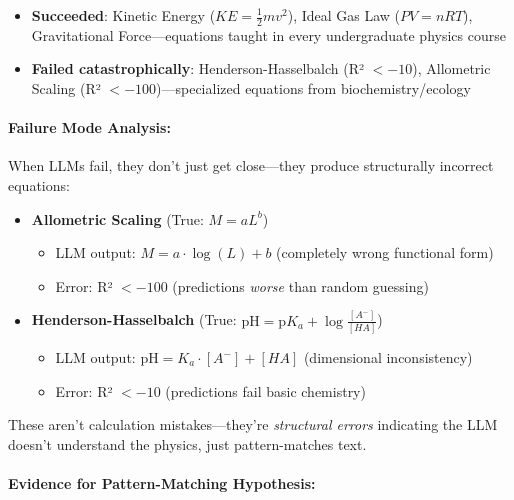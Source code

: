 \begin{itemize}
    \item \textbf{Succeeded}: Kinetic Energy ($KE = \frac{1}{2}mv^2$), Ideal Gas Law ($PV = nRT$), Gravitational Force—equations taught in every undergraduate physics course

    \item \textbf{Failed catastrophically}: Henderson-Hasselbalch (R² $< -10$), Allometric Scaling (R² $< -100$)—specialized equations from biochemistry/ecology
\end{itemize}

\paragraph{Failure Mode Analysis:}

When LLMs fail, they don't just get close—they produce structurally incorrect equations:

\begin{itemize}
    \item \textbf{Allometric Scaling} (True: $M = aL^b$)
    \begin{itemize}
        \item LLM output: $M = a \cdot \log(L) + b$ (completely wrong functional form)
        \item Error: R² $< -100$ (predictions \emph{worse} than random guessing)
    \end{itemize}

    \item \textbf{Henderson-Hasselbalch} (True: $\text{pH} = \text{p}K_a + \log\frac{[A^-]}{[HA]}$)
    \begin{itemize}
        \item LLM output: $\text{pH} = K_a \cdot [A^-] + [HA]$ (dimensional inconsistency)
        \item Error: R² $< -10$ (predictions fail basic chemistry)
    \end{itemize}
\end{itemize}

These aren't calculation mistakes—they're \emph{structural errors} indicating the LLM doesn't understand the physics, just pattern-matches text.

\paragraph{Evidence for Pattern-Matching Hypothesis:}

